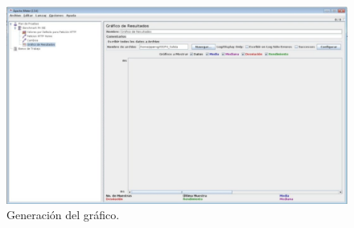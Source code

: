 \begin{figure}[H]
\begin{center}
\includegraphics[scale=0.4]{imagenes/imagen4-6.eps}
\caption{Generación del gráfico.}
\end{center}
\end{figure}


